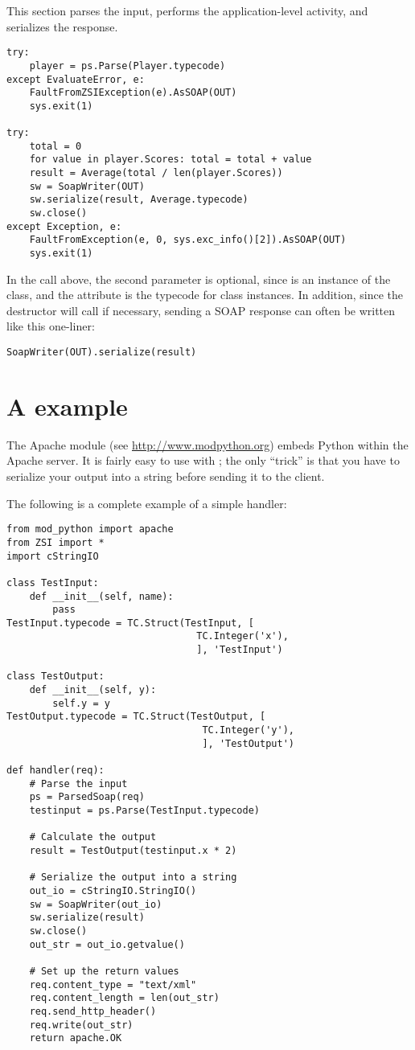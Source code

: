 This section parses the input, performs the application-level
activity, and serializes the response.
\begin{verbatim}
try:
    player = ps.Parse(Player.typecode)
except EvaluateError, e:
    FaultFromZSIException(e).AsSOAP(OUT)
    sys.exit(1)

try:
    total = 0
    for value in player.Scores: total = total + value
    result = Average(total / len(player.Scores))
    sw = SoapWriter(OUT)
    sw.serialize(result, Average.typecode)
    sw.close()
except Exception, e:
    FaultFromException(e, 0, sys.exc_info()[2]).AsSOAP(OUT)
    sys.exit(1)
\end{verbatim}

In the  call above, the second parameter is optional,
since  is an instance of the 
 class, and the  attribute is
the typecode for class instances.
In addition, since the  destructor will call 
if necessary, sending a SOAP response can often be written like
this one-liner:
\begin{verbatim}
SoapWriter(OUT).serialize(result)
\end{verbatim}


\section{A  example}

The Apache module  (see
\url{http://www.modpython.org}) embeds Python within the Apache server.
It is fairly easy to use \ZSI{} with ; the only ``trick''
is that you have to serialize your output into a string before
sending it to the client.

The following is a complete example of a simple handler:

\begin{verbatim}
from mod_python import apache
from ZSI import *
import cStringIO

class TestInput:
    def __init__(self, name):
        pass
TestInput.typecode = TC.Struct(TestInput, [
                                 TC.Integer('x'),
                                 ], 'TestInput')

class TestOutput:
    def __init__(self, y):
        self.y = y
TestOutput.typecode = TC.Struct(TestOutput, [
                                  TC.Integer('y'),
                                  ], 'TestOutput')

def handler(req):
    # Parse the input
    ps = ParsedSoap(req)
    testinput = ps.Parse(TestInput.typecode)

    # Calculate the output
    result = TestOutput(testinput.x * 2)

    # Serialize the output into a string
    out_io = cStringIO.StringIO()
    sw = SoapWriter(out_io)
    sw.serialize(result)
    sw.close()
    out_str = out_io.getvalue()

    # Set up the return values
    req.content_type = "text/xml"
    req.content_length = len(out_str)
    req.send_http_header()
    req.write(out_str)
    return apache.OK
\end{verbatim}
